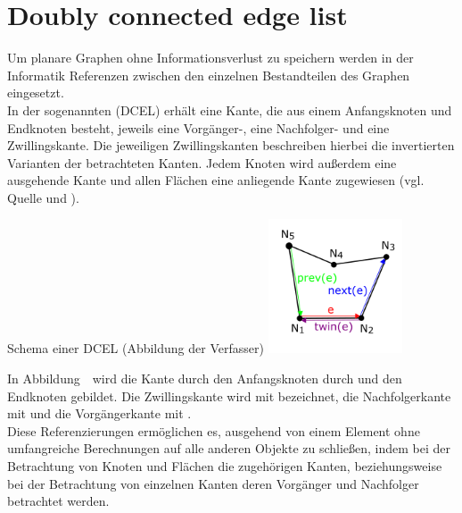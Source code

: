 \section{Doubly connected edge list}
Um planare Graphen ohne Informationsverlust zu speichern werden in der Informatik Referenzen zwischen den einzelnen Bestandteilen des Graphen eingesetzt. \\
In der sogenannten  (DCEL) erhält eine Kante, die aus einem Anfangsknoten und Endknoten besteht, jeweils eine Vorgänger-, eine Nachfolger- und eine Zwillingskante. 
Die jeweiligen Zwillingskanten beschreiben hierbei die invertierten Varianten der betrachteten Kanten.
Jedem Knoten wird außerdem eine ausgehende Kante und allen Flächen eine anliegende Kante zugewiesen (vgl. Quelle \cite{dcel} und \cite{dcelwiki}). \\
\begin{Bild}{Schema einer DCEL (Abbildung der Verfasser)}
	\includegraphics[width=150px]{Bilder/DCEL_Scheme}
\end{Bild}
In Abbildung~\thebildnr\ wird die Kante  durch den Anfangsknoten durch  und den Endknoten  gebildet.
Die Zwillingskante wird mit  bezeichnet, die Nachfolgerkante mit  und die Vorgängerkante mit . \\
Diese Referenzierungen ermöglichen es, ausgehend von einem Element ohne umfangreiche Berechnungen auf alle anderen Objekte zu schließen, indem bei der Betrachtung von Knoten und Flächen die zugehörigen Kanten, beziehungsweise bei der Betrachtung von einzelnen Kanten deren Vorgänger und Nachfolger betrachtet werden.


